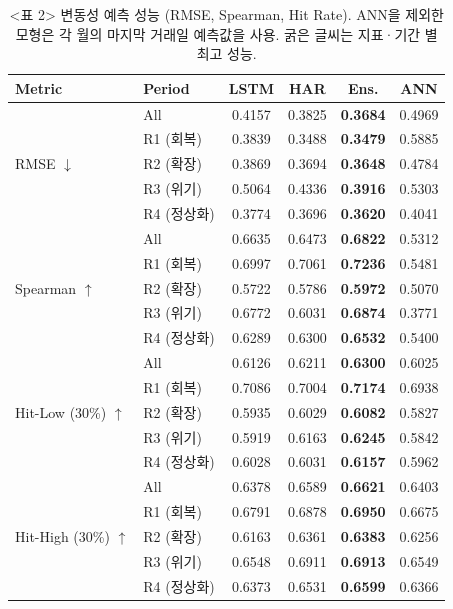 \documentclass{article}
\begin{document}
\begin{table}[ht]
\centering
\caption{<표 2> 변동성 예측 성능 (RMSE, Spearman, Hit Rate). ANN을 제외한 모형은 각 월의 마지막 거래일 예측값을 사용. 굵은 글씨는 지표·기간 별 최고 성능.}
\label{tab:sigma_pred}
\setlength{\tabcolsep}{6pt}
\renewcommand{\arraystretch}{1.15}
\begin{tabular}{ll cccc}
\toprule
Metric & Period & LSTM & HAR & Ens. & ANN \\
\midrule
\multirow{5}{*}{RMSE $\downarrow$}
 & All       & 0.4157 & 0.3825 & \textbf{0.3684} & 0.4969 \\
 & R1 (회복)   & 0.3839 & 0.3488 & \textbf{0.3479} & 0.5885 \\
 & R2 (확장)   & 0.3869 & 0.3694 & \textbf{0.3648} & 0.4784 \\
 & R3 (위기)   & 0.5064 & 0.4336 & \textbf{0.3916} & 0.5303 \\
 & R4 (정상화) & 0.3774 & 0.3696 & \textbf{0.3620} & 0.4041 \\
\midrule
\multirow{5}{*}{Spearman $\uparrow$}
 & All       & 0.6635 & 0.6473 & \textbf{0.6822} & 0.5312 \\
 & R1 (회복)   & 0.6997 & 0.7061 & \textbf{0.7236} & 0.5481 \\
 & R2 (확장)   & 0.5722 & 0.5786 & \textbf{0.5972} & 0.5070 \\
 & R3 (위기)   & 0.6772 & 0.6031 & \textbf{0.6874} & 0.3771 \\
 & R4 (정상화) & 0.6289 & 0.6300 & \textbf{0.6532} & 0.5400 \\
\midrule
\multirow{5}{*}{Hit-Low (30\%) $\uparrow$}
 & All       & 0.6126 & 0.6211 & \textbf{0.6300} & 0.6025 \\
 & R1 (회복)   & 0.7086 & 0.7004 & \textbf{0.7174} & 0.6938 \\
 & R2 (확장)   & 0.5935 & 0.6029 & \textbf{0.6082} & 0.5827 \\
 & R3 (위기)   & 0.5919 & 0.6163 & \textbf{0.6245} & 0.5842 \\
 & R4 (정상화) & 0.6028 & 0.6031 & \textbf{0.6157} & 0.5962 \\
\midrule
\multirow{5}{*}{Hit-High (30\%) $\uparrow$}
 & All       & 0.6378 & 0.6589 & \textbf{0.6621} & 0.6403 \\
 & R1 (회복)   & 0.6791 & 0.6878 & \textbf{0.6950} & 0.6675 \\
 & R2 (확장)   & 0.6163 & 0.6361 & \textbf{0.6383} & 0.6256 \\
 & R3 (위기)   & 0.6548 & 0.6911 & \textbf{0.6913} & 0.6549 \\
 & R4 (정상화) & 0.6373 & 0.6531 & \textbf{0.6599} & 0.6366 \\
\bottomrule
\end{tabular}
\end{table}
\end{document}
